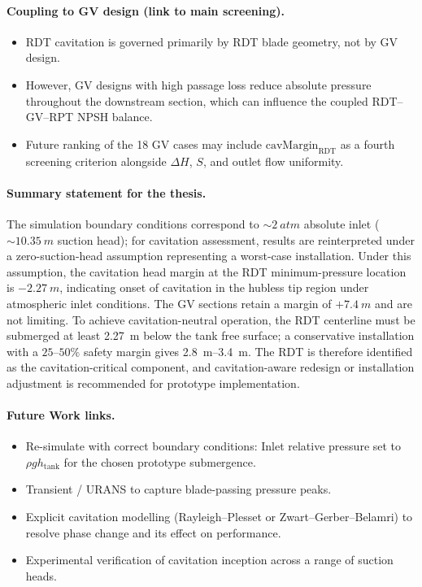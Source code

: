 \paragraph{Coupling to GV design (link to main screening).}
\begin{itemize}
    \item RDT cavitation is governed primarily by RDT blade geometry, not by GV design.
    \item However, GV designs with high passage loss reduce absolute pressure throughout the downstream section, which can influence the coupled RDT--GV--RPT NPSH balance.
    \item Future ranking of the 18 GV cases may include $\mathrm{cavMargin}_\mathrm{RDT}$ as a fourth screening criterion alongside $\Delta H$, $S$, and outlet flow uniformity.
\end{itemize}

\paragraph{Summary statement for the thesis.}
The simulation boundary conditions correspond to $\sim\!\SI{2}{atm}$ absolute inlet ($\sim\!\SI{10.35}{m}$ suction head); for cavitation assessment, results are reinterpreted under a zero-suction-head assumption representing a worst-case installation. Under this assumption, the cavitation head margin at the RDT minimum-pressure location is $-\SI{2.27}{m}$, indicating onset of cavitation in the hubless tip region under atmospheric inlet conditions. The GV sections retain a margin of $+\SI{7.4}{m}$ and are not limiting. To achieve cavitation-neutral operation, the RDT centerline must be submerged at least \SI{2.27}{m} below the tank free surface; a conservative installation with a $25\text{--}50\%$ safety margin gives \SIrange{2.8}{3.4}{m}. The RDT is therefore identified as the cavitation-critical component, and cavitation-aware redesign or installation adjustment is recommended for prototype implementation.

\paragraph{Future Work links.}
\begin{itemize}
    \item Re-simulate with correct boundary conditions: Inlet relative pressure set to $\rho g h_\mathrm{tank}$ for the chosen prototype submergence.
    \item Transient / URANS to capture blade-passing pressure peaks.
    \item Explicit cavitation modelling (Rayleigh--Plesset or Zwart--Gerber--Belamri) to resolve phase change and its effect on performance.
    \item Experimental verification of cavitation inception across a range of suction heads.
\end{itemize}